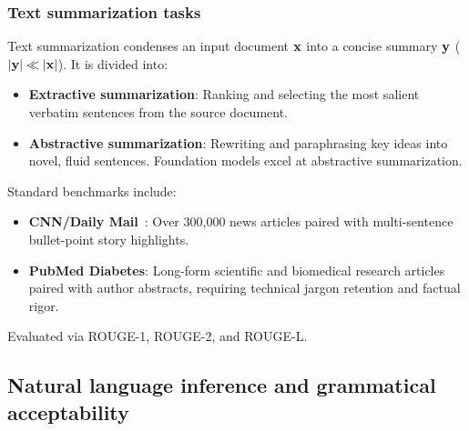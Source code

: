 \documentclass[../../main.tex]{subfiles}
\begin{document}
\subsubsection{Text summarization tasks}
Text summarization condenses an input document $\mathbf{x}$ into a concise summary $\mathbf{y}$ ($|\mathbf{y}| \ll |\mathbf{x}|$). It is divided into:
\begin{itemize}
    \item \textbf{Extractive summarization}: Ranking and selecting the most salient verbatim sentences from the source document.
    \item \textbf{Abstractive summarization}: Rewriting and paraphrasing key ideas into novel, fluid sentences. Foundation models excel at abstractive summarization.
\end{itemize}
Standard benchmarks include:
\begin{itemize}
    \item \textbf{CNN/Daily Mail}~\cite{lin2004rouge}: Over 300,000 news articles paired with multi-sentence bullet-point story highlights.
    \item \textbf{PubMed Diabetes}: Long-form scientific and biomedical research articles paired with author abstracts, requiring technical jargon retention and factual rigor.
\end{itemize}
Evaluated via ROUGE-1, ROUGE-2, and ROUGE-L.

\subsection{Natural language inference and grammatical acceptability}
\label{subsec:nli_grammatical_acceptability}
\end{document}
